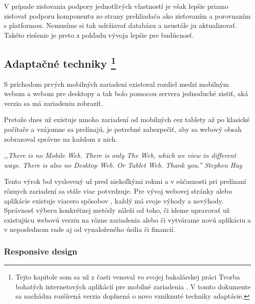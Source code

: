 V prípade zisťovania podpory jednotlivých vlastností je však lepšie priamo zisťovať podporu komponentu zo strany prehliadača ako zisťovaním a porovnaním s platformou. Nemusíme si tak udržiavať databázu a neustále ju aktualizovať. Takéto riešenie je preto z pohľadu vývoja lepšie pre budúcnosť.



\newpage

\subsection{Adaptačné techniky \footnote{Tejto kapitole som sa už z časti venoval vo svojej bakalárskej práci Tvorba bohatých internetových aplikácií pre mobilné zariadenia \cite{ja}. V tomto dokumente sa nachádza rozšírená verzia doplnená o novo vzniknuté techniky adaptácie.}} %
\label{sub:adapta_n_techniky}

S príchodom prvých mobilných zariadení existoval rozdiel medzi mobilným webom a webom pre desktopy a tak bolo pomocou servera jednoduché zistiť, aká verzia sa má zariadeniu zobraziť.

Pretože dnes už existuje mnoho zariadení od mobilných cez tablety až po klasické počítače a vzájomne sa prelínajú, je potrebné zabezpečiť, aby sa webový obsah zobrazoval správne na každom z nich.\\

\begin{fancybox}
\textit{,,There is no Mobile Web. There is only The Web, which we view in different ways. There is also no Desktop Web. Or Tablet Web. Thank you.'' Stephen Hay} \cite{noMobileWeb}
\end{fancybox}

Tento výrok bol vyslovený už pred niekoľkými rokmi a v súčasnosti pri prelínaní rôznych zariadení sa stále viac potvrdzuje. Pre vývoj webovej stránky alebo aplikácie existuje viacero spôsobov \cite{mobiforge}, každý má svoje výhody a nevýhody. Správnosť výberu konkrétnej metódy záleži od toho, či ideme upravovať už existujúcu webovú verziu na rôzne zariadenia alebo či vytvárame novú aplikáciu a v neposlednom rade aj od vynaloženého úsilia či financií.


\subsubsection{Responsive design} %
\label{ssub:responsive_design}

